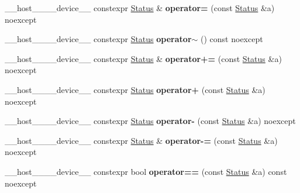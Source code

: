 \begin{DoxyCompactItemize}
\+\_\+\+\_\+host\+\_\+\+\_\+\+\_\+\+\_\+device\+\_\+\+\_\+ constexpr \hyperlink{classwarpcore_1_1Status}{Status} \& {\bfseries operator=} (const \hyperlink{classwarpcore_1_1Status}{Status} \&a) noexcept
\item 
\mbox{\label{classwarpcore_1_1Status_ab3a333d279f2de191979d54b01c716ac}} 
\+\_\+\+\_\+host\+\_\+\+\_\+\+\_\+\+\_\+device\+\_\+\+\_\+ constexpr \hyperlink{classwarpcore_1_1Status}{Status} {\bfseries operator$\sim$} () const noexcept
\item 
\mbox{\label{classwarpcore_1_1Status_aeacd648463b5ac7ae3019fc808eb8160}} 
\+\_\+\+\_\+host\+\_\+\+\_\+\+\_\+\+\_\+device\+\_\+\+\_\+ constexpr \hyperlink{classwarpcore_1_1Status}{Status} \& {\bfseries operator+=} (const \hyperlink{classwarpcore_1_1Status}{Status} \&a) noexcept
\item 
\mbox{\label{classwarpcore_1_1Status_a00d9d20cdcc7c1299e00365eece0158d}} 
\+\_\+\+\_\+host\+\_\+\+\_\+\+\_\+\+\_\+device\+\_\+\+\_\+ constexpr \hyperlink{classwarpcore_1_1Status}{Status} {\bfseries operator+} (const \hyperlink{classwarpcore_1_1Status}{Status} \&a) noexcept
\item 
\mbox{\label{classwarpcore_1_1Status_a8c67e3cd67fcd7255de055b969dae293}} 
\+\_\+\+\_\+host\+\_\+\+\_\+\+\_\+\+\_\+device\+\_\+\+\_\+ constexpr \hyperlink{classwarpcore_1_1Status}{Status} {\bfseries operator-\/} (const \hyperlink{classwarpcore_1_1Status}{Status} \&a) noexcept
\item 
\mbox{\label{classwarpcore_1_1Status_a22aa3d5cab1154c71b241204b9f0711b}} 
\+\_\+\+\_\+host\+\_\+\+\_\+\+\_\+\+\_\+device\+\_\+\+\_\+ constexpr \hyperlink{classwarpcore_1_1Status}{Status} \& {\bfseries operator-\/=} (const \hyperlink{classwarpcore_1_1Status}{Status} \&a) noexcept
\item 
\mbox{\label{classwarpcore_1_1Status_a81cc6518597e1bcf3a15264a4d643aaa}} 
\+\_\+\+\_\+host\+\_\+\+\_\+\+\_\+\+\_\+device\+\_\+\+\_\+ constexpr bool {\bfseries operator==} (const \hyperlink{classwarpcore_1_1Status}{Status} \&a) const noexcept
\item 
\mbox{\label{classwarpcore_1_1Status_a01d6e2228b4081ec567e21729d8d1eb5}} 

\end{DoxyCompactItemize}
